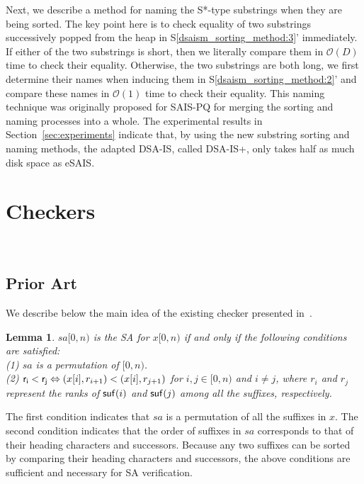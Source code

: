 \documentclass[10pt,journal,compsoc]{IEEEtran}
\newtheorem{lemma}[theorem]{Lemma}
\begin{document}
Next, we describe a method for naming the S*-type substrings when they are being sorted. The key point here is to check equality of two substrings successively popped from the heap in S\ref{dsaism_sorting_method:3}' immediately. If either of the two substrings is short, then we literally compare them in $\mathcal{O}(D)$ time to check their equality. Otherwise, the two substrings are both long, we first determine their names when inducing them in S\ref{dsaism_sorting_method:2}' and compare these names in $\mathcal{O}(1)$ time to check their equality. This naming technique was originally proposed for SAIS-PQ for merging the sorting and naming processes into a whole. The experimental results in Section~\ref{sec:experiments} indicate that, by using the new substring sorting and naming methods, the adapted DSA-IS, called DSA-IS+, only takes half as much disk space as eSAIS.

\section{Checkers}~\label{sec:checkers}

\subsection{Prior Art} \label{sec:checkers:prior_art}

We describe below the main idea of the existing checker presented in~\cite{Dementiev2008a}.

\begin{lemma} \label{lemma:1}
	$sa[0, n)$ is the SA for $x[0, n)$ if and only if the following conditions are satisfied:\\
	(1) $sa$ is a permutation of $[0, n)$. \\	
	(2) ${\sf r_i < r_j} \Leftrightarrow (x[i], r_{i + 1}) < (x[i], r_{j + 1})$ for $ i, j \in [0, n)$ and $i\ne j$, where $r_i$ and $r_j$ represent the ranks of ${\sf suf}(i)$ and ${\sf suf}(j)$ among all the suffixes, respectively. \\
\end{lemma}

\begin{IEEEproof}The first condition indicates that $sa$ is a permutation of all the suffixes in $x$. The second condition indicates that the order of suffixes in $sa$ corresponds to that of their heading characters and successors. Because any two suffixes can be sorted by comparing their heading characters and successors, the above conditions are sufficient and necessary for SA verification.

\end{IEEEproof}
\end{document}
